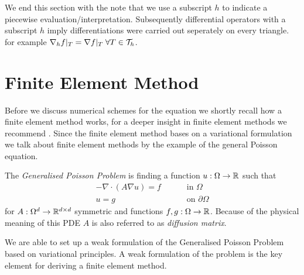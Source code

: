 We end this section with the note that we use a subscript $h$ to indicate a piecewise evaluation/interpretation.  Subsequently differential operators with a subscript $h$ imply differentiations were carried out seperately on every triangle. for example $\nabla_h f |_T = \nabla f |_T \; \forall T \in \mathcal{T}_h$. 



\section{Finite Element Method}
Before we discuss numerical schemes for the \MA equation we shortly recall how a finite element method works, for a deeper insight in finite element methods we recommend \cite{Braess2003, BS2002}. Since the finite element method bases on a variational formulation we talk about finite element methods by the example of the general Poisson equation. 


\begin{definition} \label{def: General Poisson Problem}
The \emph{Generalised Poisson Problem} is finding a function $u:\Omega \rightarrow \mathbb{R}$ such that 
\begin{align}
	-\nabla \cdot (A \nabla u) = f \qquad &\text{ in }\Omega \label{eq: poisson eq} \\
	u = g \qquad &\text{ on } \partial \Omega    \label{eq: poisson bc}
\end{align}
for $ A:\Omega^d \rightarrow \mathbb{R}^{d \times d}$ symmetric and functions $f,g:\Omega \rightarrow \mathbb{R} $. 
Because of the physical meaning of this PDE $A$ is also referred to as \emph{diffusion matrix}.
\end{definition}

We are able to set up a weak formulation of the Generalised Poisson Problem based on variational principles. A weak formulation of the problem is the key element for deriving a finite element method.

